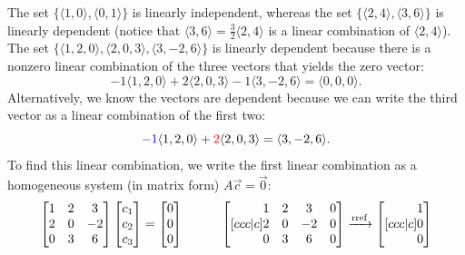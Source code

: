 {\begin{example}\label{first linearly independent example}
The set $\{\langle1,0\rangle, \langle0,1\rangle\}$ is linearly independent, whereas the set $\{\langle2,4\rangle, \langle3,6\rangle\}$ is linearly dependent (notice that $\langle3,6\rangle = \frac{3}{2}\langle2,4\rangle$ is a linear combination of $\langle2,4\rangle$). The set $\{\langle1,2,0\rangle, \langle2,0,3\rangle, \langle3,-2,6\rangle\}$ is linearly dependent because there is a nonzero linear combination of the three vectors that yields the zero vector:
$$-1\langle1,2,0\rangle+2\langle2,0,3\rangle-1\langle3,-2,6\rangle=\langle0,0,0\rangle.$$ 
Alternatively, we know the vectors are dependent because we can write the third vector as a linear combination of the first two:
$${\color{blue}-1}\langle1,2,0\rangle+{\color{red}2}\langle2,0,3\rangle=\langle3,-2,6\rangle.$$ 
To find this linear combination, we write the first linear combination as a homogeneous system (in matrix form) $A\vec c=\vec 0$:  
$$\begin{bmatrix}
\cl{1\\2\\0}
&\cl{2\\0\\3}
&\cl{3\\-2\\6}
\end{bmatrix}
\begin{bmatrix}
c_1\\c_2\\c_3
\end{bmatrix}
=
\begin{bmatrix}
0\\0\\0
\end{bmatrix}
\quad\quad\quad
\begin{bmatrix}[ccc|c]
\cl{1\\2\\0}
&\cl{2\\0\\3}
&\cl{3\\-2\\6}
&\cl{0\\0\\0}
\end{bmatrix}
\xrightarrow{\rref}
\begin{bmatrix}[ccc|c]
\cl{1\\0\\0}

\end{bmatrix}$$
\end{example}}
